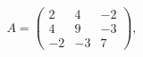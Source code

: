\documentclass[preview]{standalone}
\begin{document}
\begin{align*}
A = \begin{pmatrix} 2 & 4 & -2 \\ 4 & 9 & -3 \\ -2 & -3 & 7 \end{pmatrix},\quad
\end{align*}
\end{document}
